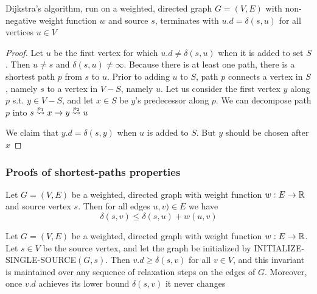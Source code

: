 \documentclass[11pt]{article}
\begin{document}
\begin{theorem}
Dijkstra's algorithm, run on a weighted, directed graph \(G=(V,E)\) with non-negative weight
function \(w\) and source \(s\), terminates with \(u.d=\delta(s,u)\) for all vertices \(u\in V\)
\end{theorem}

\begin{proof}
Let \(u\) be the first vertex for which \(u.d\neq\delta(s,u)\) when it is added to set \(S\).
Then \(u\neq s\) and \(\delta(s,u)\neq\infty\). Because there is at least one path, there is a shortest
path \(p\) from \(s\) to \(u\). Prior to adding \(u\) to \(S\), path \(p\) connects a vertex
in \(S\), namely \(s\) to a vertex in \(V-S\), namely \(u\). Let us consider the first
vertex \(y\) along \(p\) s.t. \(y\in V-S\), and let \(x\in S\) be \(y\)'s predecessor along \(p\).
We can decompose path \(p\) into \(s\overset{p_1}{\rightsquigarrow}x\to y\overset{p_2}{\rightsquigarrow}u\)

We claim that \(y.d=\delta(s,y)\) when \(u\) is added to \(S\). But \(y\) should be chosen after \(x\)
\end{proof}

\begin{exercise}

\end{exercise}
\subsubsection{Proofs of shortest-paths properties}
\label{sec:orgc40bb34}
\begin{lemma}
Let \(G=(V,E)\) be a weighted, directed graph with weight function \(w:E\to\mathbb{R}\) and source
vertex \(s\). Then for all edges \(u,v)\in E\) we have
\begin{equation*}
\delta(s,v)\le\delta(s,u)+w(u,v)
\end{equation*}
\end{lemma}

\begin{lemma}
Let \(G=(V,E)\) be a weighted, directed graph with weight function \(w:E\to\mathbb{R}\). Let \(s\in V\) be
the source vertex, and let the graph be initialized by INITIALIZE-SINGLE-SOURCE\((G,s)\).
Then \(v.d\ge\delta(s,v)\) for all \(v\in V\), and this invariant is maintained over any sequence of
relaxation steps on the edges of \(G\). Moreover, once \(v.d\) achieves its lower
bound \(\delta(s,v)\) it never changes
\end{lemma}
\end{document}
